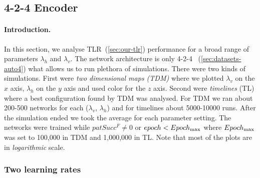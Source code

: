 

\subsection{4-2-4 Encoder} 
\label{sec:results-auto4} 


\paragraph{Introduction.} 
\label{sec:results-auto4-introduction} 
In this section, we analyse TLR~(\ref{sec:our-tlr}) performance for a broad range of parameters $\lambda_h$ and $\lambda_v$. The network architecture is only 4-2-4~
(\ref{sec:datasets-auto4}) what allows us to run plethora of simulations. There were two kinds of simulations. First were \emph{two dimensional maps (TDM)} where we plotted $\lambda_v$ on the $x$ axis, $\lambda_h$ on the $y$ axis and used color for the $z$ axis. Second were \emph{timelines} (TL) where a best configuration found by TDM was analysed. For TDM we ran about 200-500 networks for each ($\lambda_v$, $\lambda_h$) and for timelines about 5000-10000 runs. After the simulation ended we took the average for each parameter setting. The networks were trained while $patSucc^F \neq 0$ or $epoch < Epoch_{\rm max}$ where $Epoch_{\rm max}$ was set to 100,000 in TDM and 1,000,000 in TL. Note that most of the plots are in \emph{logarithmic} scale. 

 

\subsubsection{Two learning rates} 
\label{sec:tlr-auto4}

